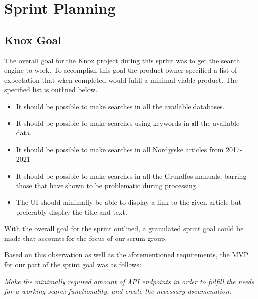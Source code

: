 \section{Sprint Planning}

\subsection{Knox Goal}\label{ssec:sprint3Goal}
The overall goal for the Knox project during this sprint was to get the search engine to work. To accomplish this goal the product owner specified a list of expectation that when completed would fufill a minimal viable product. The specified list is outlined below.
\begin{itemize}
	\item It should be possible to make searches in all the available databases.
	\item It should be possible to make searches using keywords in all the available data.
	\item It should be possible to make searches in all Nordjyske articles from 2017-2021
	\item It should be possible to make searches in all the Grundfos manuals, barring those that have shown to be problematic during processing.
	\item The UI should minimally be able to display a link to the given article but preferably display the title and text.
\end{itemize}
With the overall goal for the sprint outlined, a granulated sprint goal could be made that accounts for the focus of our scrum group.


Based on this observation as well as the aforementioned requirements, the MVP for our part of the sprint goal was as follows:
\vspace{\baselineskip}

\textit{Make the minimally required amount of API endpoints in order to fulfill the needs for a working search functionality, and create the necessary documenation.}

